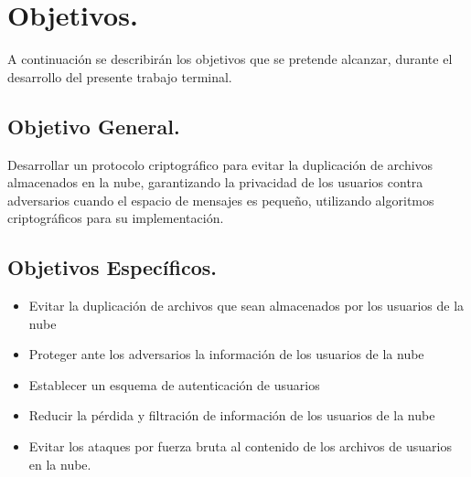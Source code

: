 


\section{Objetivos. } %
A continuaci\'on se describir\'an los objetivos que se pretende alcanzar, durante el desarrollo del presente trabajo terminal. 

\subsection{Objetivo General.} %
Desarrollar un protocolo criptográfico para evitar la duplicación de archivos almacenados en la nube, garantizando la privacidad de los usuarios contra adversarios cuando el espacio de mensajes es pequeño, utilizando algoritmos criptográficos para su implementación. 
\subsection{Objetivos Específicos.} %
\begin{itemize}
\item Evitar la duplicación de archivos que sean almacenados por los usuarios de la nube
\item Proteger ante los adversarios la información de los usuarios de la nube
\item Establecer un esquema de autenticación de usuarios 
\item Reducir la pérdida y filtración de información de los usuarios de la nube
\item Evitar los ataques por fuerza bruta al contenido de los archivos de usuarios en la nube. 
\end{itemize}

